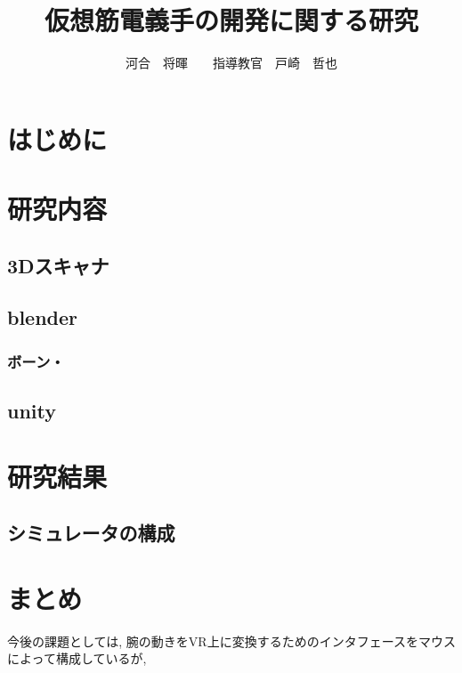 \documentclass[twocolumn]{jsarticle}
\title{仮想筋電義手の開発に関する研究}
\author{河合　将暉　　指導教官　戸崎　哲也}
\date{}
\begin{document}
\maketitle

\section{はじめに}
	
	\section{研究内容}
		\subsection{3Dスキャナ}
		\subsection{blender}
		\subsubsection{ボーン・}
		\subsection{unity}
		

\section{研究結果}
	\subsection{シミュレータの構成}
\section{まとめ}
	今後の課題としては, 腕の動きをVR上に変換するためのインタフェースをマウスによって構成しているが, 

\begin{thebibliography}{99}
\end{thebibliography}
\end{document}
